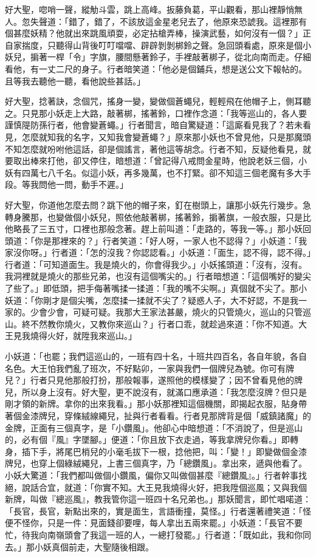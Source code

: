 好大聖，唿哨一聲，縱觔斗雲，跳上高峰。扳藤負葛，平山觀看，那山裡靜悄無人。忽失聲道：「錯了，錯了，不該放這金星老兒去了，他原來恐諕我。這裡那有個甚麼妖精？他就出來跳風頑耍，必定拈槍弄棒，操演武藝，如何沒有一個？」正自家揣度，只聽得山背後叮叮噹噹、辟辟剝剝梆鈴之聲。急回頭看處，原來是個小妖兒，掮著一桿「令」字旗，腰間懸著鈴子，手裡敲著梆子，從北向南而走。仔細看他，有一丈二尺的身子。行者暗笑道：「他必是個鋪兵，想是送公文下報帖的。且等我去聽他一聽，看他說些甚話。」

好大聖，捻著訣，念個咒，搖身一變，變做個蒼蠅兒，輕輕飛在他帽子上，側耳聽之。只見那小妖走上大路，敲著梆，搖著鈴，口裡作念道：「我等巡山的，各人要謹慎隄防孫行者，他會變蒼蠅。」行者聞言，暗自驚疑道：「這廝看見我了？若未看見，怎麼就知我的名字，又知我會變蒼蠅？」原來那小妖也不曾見他，只是那魔頭不知怎麼就吩咐他這話，卻是個謠言，著他這等胡念。行者不知，反疑他看見，就要取出棒來打他，卻又停住，暗想道：「曾記得八戒問金星時，他說老妖三個，小妖有四萬七八千名。似這小妖，再多幾萬，也不打緊。卻不知這三個老魔有多大手段。等我問他一問，動手不遲。」

好大聖，你道他怎麼去問？跳下他的帽子來，釘在樹頭上，讓那小妖先行幾步。急轉身騰那，也變做個小妖兒，照依他敲著梆，搖著鈴，掮著旗，一般衣服，只是比他略長了三五寸，口裡也那般念著。趕上前叫道：「走路的，等我一等。」那小妖回頭道：「你是那裡來的？」行者笑道：「好人呀，一家人也不認得？」小妖道：「我家沒你呀。」行者道：「怎的沒我？你認認看。」小妖道：「面生，認不得，認不得。」行者道：「可知道面生。我是燒火的，你會得我少。」小妖搖頭道：「沒有，沒有。我洞裡就是燒火的那些兄弟，也沒有這個嘴尖的。」行者暗想道：「這個嘴好的變尖了些了。」即低頭，把手侮著嘴揉一揉道：「我的嘴不尖啊。」真個就不尖了。那小妖道：「你剛才是個尖嘴，怎麼揉一揉就不尖了？疑惑人子，大不好認，不是我一家的。少會少會，可疑可疑。我那大王家法甚嚴，燒火的只管燒火，巡山的只管巡山。終不然教你燒火，又教你來巡山？」行者口乖，就趁過來道：「你不知道。大王見我燒得火好，就陞我來巡山。」

小妖道：「也罷；我們這巡山的，一班有四十名，十班共四百名，各自年貌，各自名色。大王怕我們亂了班次，不好點卯，一家與我們一個牌兒為號。你可有牌兒？」行者只見他那般打扮，那般報事，遂照他的模樣變了；因不曾看見他的牌兒，所以身上沒有。好大聖，更不說沒有，就滿口應承道：「我怎麼沒牌？但只是剛才領的新牌。拿你的出來我看。」那小妖那裡知這個機關，即揭起衣服，貼身帶著個金漆牌兒，穿條絨線繩兒，扯與行者看看。行者見那牌背是個「威鎮諸魔」的金牌，正面有三個真字，是「小鑽風」。他卻心中暗想道：「不消說了，但是巡山的，必有個『風』字墜腳。」便道：「你且放下衣走過，等我拿牌兒你看。」即轉身，插下手，將尾巴梢兒的小毫毛拔下一根，捻他把，叫：「變！」即變做個金漆牌兒，也穿上個綠絨繩兒，上書三個真字，乃「總鑽風」。拿出來，遞與他看了。小妖大驚道：「我們都叫做個小鑽風，偏你又叫做個甚麼『總鑽風』。」行者幹事找絕，說話合宜，就道：「你實不知。大王見我燒得火好，把我陞個巡風；又與我個新牌，叫做『總巡風』，教我管你這一班四十名兄弟也。」那妖聞言，即忙唱喏道：「長官，長官，新點出來的，實是面生，言語衝撞，莫怪。」行者還著禮笑道：「怪便不怪你，只是一件：見面錢卻要哩，每人拿出五兩來罷。」小妖道：「長官不要忙，待我向南嶺頭會了我這一班的人，一總打發罷。」行者道：「既如此，我和你同去。」那小妖真個前走，大聖隨後相跟。

